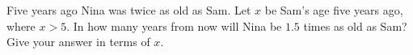 Five years ago Nina was twice as old as Sam. Let $x$ be Sam's age five years ago, where $x>5$. In how many years from now will Nina be $1.5$ times as old as Sam? Give your answer in terms of $x$.
